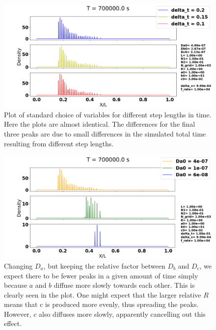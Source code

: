 \documentclass[1p]{elsarticle}        	%
\begin{document}
\begin{figure}
	\centering
	\includegraphics[width=\linewidth]{../figures/deltaT.png}
	\caption{Plot of standard choice of variables for different step lengths in time. Here the plots are almost identical. The differences for the final three peaks are due to small differences in the simulated total time resulting from different step lengths.}
	\label{fig:coords}
\end{figure}

\begin{figure}
	\centering
	\includegraphics[width=\linewidth]{../figures/Da0_same_ratio.png}
	\caption{Changing $D_a$, but keeping the relative factor between $D_b$ and $D_c$, we expect there to be fewer peaks in a given amount of time simply because $a$ and $b$ diffuse more slowly towards each other. This is clearly seen in the plot. One might expect that the larger relative $R$ means that c is produced more evenly, thus spreading the peaks. However, $c$ also diffuses more slowly, apparently cancelling out this effect.}
	\label{fig:coords}
\end{figure}
\end{document}
